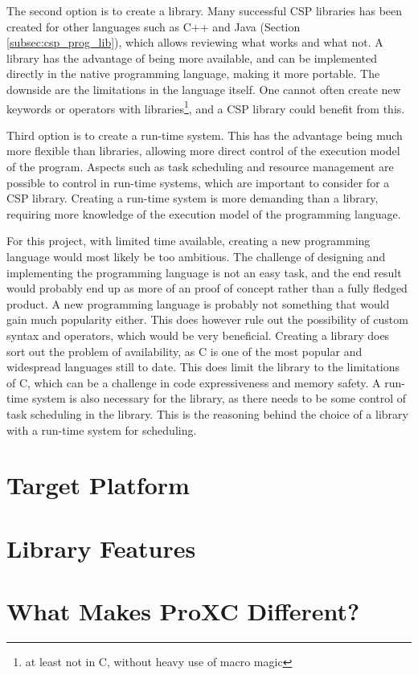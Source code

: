 The second option is to create a library. Many successful CSP libraries has been created for other languages such as C++ and Java (Section \ref{subsec:csp_prog_lib}), which allows reviewing what works and what not. A library has the advantage of being more available, and can be implemented directly in the native programming language, making it more portable. The downside are the limitations in the language itself. One cannot often create new keywords or operators with libraries\footnote{at least not in C, without heavy use of macro magic}, and a CSP library could benefit from this. 

Third option is to create a run\hyp{}time system. This has the advantage being much more flexible than libraries, allowing more direct control of the execution model of the program. Aspects such as task scheduling and resource management are possible to control in run\hyp{}time systems, which are important to consider for a CSP library. Creating a run-time system is more demanding than a library, requiring more knowledge of the execution model of the programming language.

For this project, with limited time available, creating a new programming language would most likely be too ambitious. The challenge of designing and implementing the programming language is not an easy task, and the end result would probably end up as more of an proof of concept rather than a fully fledged product. A new programming language is probably not something that would gain much popularity either. This does however rule out the possibility of custom syntax and operators, which would be very beneficial. Creating a library does sort out the problem of availability, as C is one of the most popular and widespread languages still to date. This does limit the library to the limitations of C, which can be a challenge in code expressiveness and memory safety. A run\hyp{}time system is also necessary for the library, as there needs to be some control of task scheduling in the library. This is the reasoning behind the choice of a library with a run\hyp{}time system for scheduling.


\section{Target Platform}
\label{sec:proxc_target_platform}




\section{Library Features}
\label{sec:proxc_features}




\section{What Makes ProXC Different?}
\label{sec:proxc_difference}



